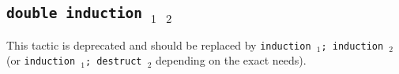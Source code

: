 \begin{coq_example*}


\subsection{\tt double induction \ident$_1$ \ident$_2$}

This tactic is deprecated and should be replaced by {\tt induction \ident$_1$; induction \ident$_2$} (or {\tt induction \ident$_1$; destruct \ident$_2$} depending on the exact needs).





\end{coq_example*}
